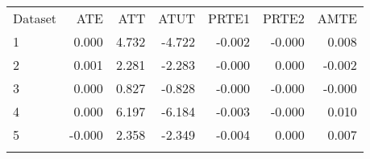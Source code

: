 \begin{tabular}{lrrrrrr}
\hline \noalign{\smallskip}Dataset & ATE & ATT & ATUT & PRTE1 & PRTE2 & AMTE\\
\noalign{\smallskip}\hline \noalign{\smallskip}1 & 0.000 & 4.732 & -4.722 & -0.002 & -0.000 & 0.008\\
2 & 0.001 & 2.281 & -2.283 & -0.000 & 0.000 & -0.002\\
3 & 0.000 & 0.827 & -0.828 & -0.000 & -0.000 & -0.000\\
4 & 0.000 & 6.197 & -6.184 & -0.003 & -0.000 & 0.010\\
5 & -0.000 & 2.358 & -2.349 & -0.004 & 0.000 & 0.007\\
\noalign{\smallskip}\hline\end{tabular}\\

